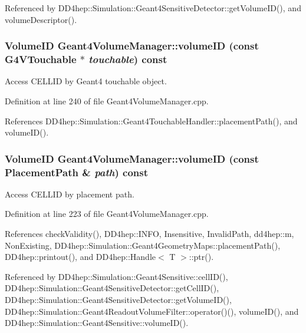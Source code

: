 Referenced by DD4hep::Simulation::Geant4SensitiveDetector::getVolumeID(), and volumeDescriptor().\hypertarget{class_d_d4hep_1_1_simulation_1_1_geant4_volume_manager_a7e0058f093af6e650c02d182818e6cbb}{
\subsubsection[{volumeID}]{\setlength{\rightskip}{0pt plus 5cm}VolumeID Geant4VolumeManager::volumeID (const G4VTouchable $\ast$ {\em touchable}) const}}
\label{class_d_d4hep_1_1_simulation_1_1_geant4_volume_manager_a7e0058f093af6e650c02d182818e6cbb}


Access CELLID by Geant4 touchable object. 

Definition at line 240 of file Geant4VolumeManager.cpp.

References DD4hep::Simulation::Geant4TouchableHandler::placementPath(), and volumeID().\hypertarget{class_d_d4hep_1_1_simulation_1_1_geant4_volume_manager_a5d46621e24295850107f3c71891e685d}{
\subsubsection[{volumeID}]{\setlength{\rightskip}{0pt plus 5cm}VolumeID Geant4VolumeManager::volumeID (const {\bf PlacementPath} \& {\em path}) const}}
\label{class_d_d4hep_1_1_simulation_1_1_geant4_volume_manager_a5d46621e24295850107f3c71891e685d}


Access CELLID by placement path. 

Definition at line 223 of file Geant4VolumeManager.cpp.

References checkValidity(), DD4hep::INFO, Insensitive, InvalidPath, dd4hep::m, NonExisting, DD4hep::Simulation::Geant4GeometryMaps::placementPath(), DD4hep::printout(), and DD4hep::Handle$<$ T $>$::ptr().

Referenced by DD4hep::Simulation::Geant4Sensitive::cellID(), DD4hep::Simulation::Geant4SensitiveDetector::getCellID(), DD4hep::Simulation::Geant4SensitiveDetector::getVolumeID(), DD4hep::Simulation::Geant4ReadoutVolumeFilter::operator()(), volumeID(), and DD4hep::Simulation::Geant4Sensitive::volumeID().

